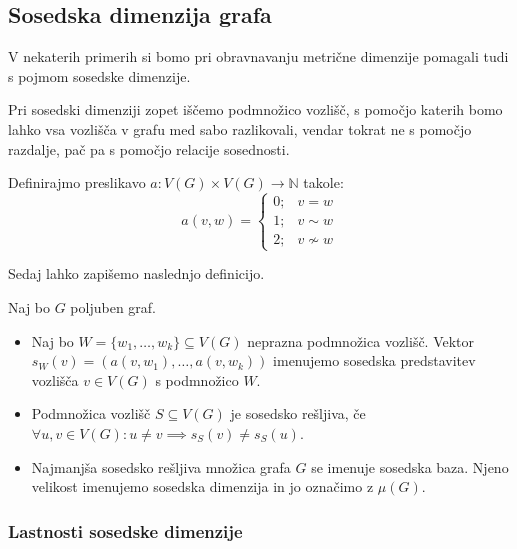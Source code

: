 \documentclass[mat1, tisk]{fmfdelo}
\newcommand{\1}{(1, 1, \ldots, 1)}
\newcommand{\2}{(2, 2, \ldots, 2)}
\begin{document}
\subsection{Sosedska dimenzija grafa} \label{ss:sdim}
V nekaterih primerih si bomo pri obravnavanju metrične dimenzije pomagali tudi s pojmom 
sosedske dimenzije. 

Pri sosedski dimenziji zopet iščemo podmnožico vozlišč, s pomočjo katerih bomo lahko vsa 
vozlišča v grafu med sabo razlikovali, vendar tokrat ne s pomočjo razdalje, pač pa s 
pomočjo relacije sosednosti. 

Definirajmo preslikavo  $a: V(G) \times V(G) \rightarrow \mathbb{N}$ takole:  
\begin{equation} \label{eq:fja_a} 
    a(v, w) = 
    \begin{cases}
        0; & v = w \\
        1; & v \sim w \\
        2; & v \not\sim w
    \end{cases} 
\end{equation} 

Sedaj lahko zapišemo naslednjo definicijo.

\begin{definicija} \label{def:sdim}
    Naj bo $G$ poljuben graf. 
    \begin{itemize}
        \item Naj bo $W = \{ w_1, \ldots , w_k  \} \subseteq V(G)$ neprazna podmnožica vozlišč. 
        Vektor $s_W(v) = (a(v, w_1), \ldots, a(v, w_k))$ imenujemo 
        sosedska predstavitev vozlišča $v \in V(G)$ s podmnožico $W$.
        \item  Podmnožica vozlišč $S \subseteq V(G)$ je sosedsko rešljiva,
        če $\forall u, v \in V(G): u\neq v \implies s_S(v) \neq s_S(u)$.
        \item Najmanjša sosedsko rešljiva množica grafa $G$ se imenuje sosedska baza. 
        Njeno velikost imenujemo sosedska dimenzija in jo označimo z $\mu (G).$
    \end{itemize}    
\end{definicija}




\subsubsection{Lastnosti sosedske dimenzije} \label{sss:lastnosti_sdim}
\end{document}
